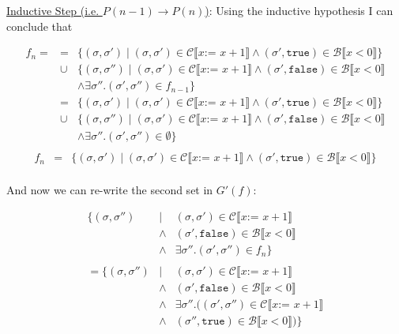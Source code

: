 \documentclass[10pt, oneside]{article}
\begin{document}
\begin{enumerate}[1.]
\begin{enumerate} [(a)]
      \underline{Inductive Step (i.e. $P(n - 1) \rightarrow P(n)$)}: Using the 
      inductive hypothesis I can conclude that 
      
      \begin{eqnarray*}
        f_n = & = & \{ (\sigma, \sigma') \mid (\sigma, \sigma') \in \mathcal{C} \llbracket x \texttt{:= } x + 1 \rrbracket \wedge (\sigma', \texttt{true}) \in \mathcal{B} \llbracket x < 0 \rrbracket \}  \\
        & \cup & \{ (\sigma, \sigma'') \mid (\sigma, \sigma')  \in \mathcal{C} \llbracket x \texttt{:= } x + 1 \rrbracket \wedge (\sigma', \texttt{false})\in \mathcal{B} \llbracket x < 0 \rrbracket \\
				& & \wedge \exists \sigma''. (\sigma', \sigma'') \in f_{n-1} \} \\
				& = & \{ (\sigma, \sigma') \mid (\sigma, \sigma') \in \mathcal{C} \llbracket x \texttt{:= } x + 1 \rrbracket \wedge (\sigma', \texttt{true}) \in \mathcal{B} \llbracket x < 0 \rrbracket \}  \\
        & \cup & \{ (\sigma, \sigma'') \mid (\sigma, \sigma')  \in \mathcal{C} \llbracket x \texttt{:= } x + 1 \rrbracket \wedge (\sigma', \texttt{false})\in \mathcal{B} \llbracket x < 0 \rrbracket \\
				& & \wedge \exists \sigma''. (\sigma', \sigma'') \in \emptyset \} \\
			\end{eqnarray*}
			\begin{eqnarray*}
				f_n & = & \{ (\sigma, \sigma') \mid (\sigma, \sigma') \in \mathcal{C} \llbracket x \texttt{:= } x + 1 \rrbracket \wedge (\sigma', \texttt{true}) \in \mathcal{B} \llbracket x < 0 \rrbracket \}  \\
			\end{eqnarray*}
			
			And now we can re-write the second set in $G'(f)$:
			
			\begin{eqnarray*}
			  \{ (\sigma, \sigma'') & \mid & (\sigma, \sigma')  \in \mathcal{C} \llbracket x \texttt{:= } x + 1 \rrbracket \\ 
			  & \wedge & (\sigma', \texttt{false})\in \mathcal{B} \llbracket x < 0 \rrbracket \\
				& \wedge & \exists \sigma''. (\sigma', \sigma'') \in f_n \} \\
				& & \\
				= \{ (\sigma, \sigma'') & \mid & (\sigma, \sigma')  \in \mathcal{C} \llbracket x \texttt{:= } x + 1 \rrbracket \\ 
			  & \wedge & (\sigma', \texttt{false})\in \mathcal{B} \llbracket x < 0 \rrbracket \\
				& \wedge & \exists \sigma''. ((\sigma', \sigma'') \in \mathcal{C} \llbracket x \texttt{:= } x + 1 \rrbracket \\
				& \wedge & (\sigma'', \texttt{true}) \in \mathcal{B} \llbracket x < 0 \rrbracket) \}
			\end{eqnarray*}
			

\end{enumerate}
\end{enumerate}
\end{document}
